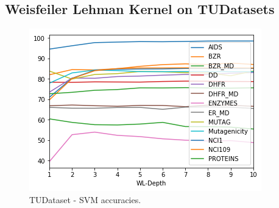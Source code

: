 \subsection{Weisfeiler Lehman Kernel on TUDatasets}\label{Appendix:FurtherResults}

\begin{figure}[H]
	\centering
	\includegraphics[width=0.7\linewidth]{images/plot_TUDataset_Benchmarks}
	\caption{TUDataset - SVM accuracies.}
	\label{fig:SVM_WL_TUDatasets}
\end{figure}

